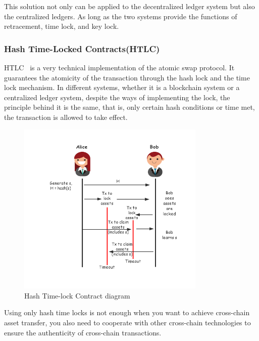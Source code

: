 \noindent This solution not only can be applied to the decentralized ledger system but also the centralized ledgers. As long as the two systems provide the functions of retracement, time lock, and key lock.

\subsubsection{Hash Time-Locked Contracts(HTLC)}
\noindent HTLC~\cite{russell2015lightning} is a very technical implementation of the atomic swap protocol. It guarantees the atomicity of the transaction through the hash lock and the time lock mechanism. In different systems, whether it is a blockchain system or a centralized ledger system, despite the ways of implementing the lock, the principle behind it is the same, that is, only certain hash conditions or time met, the transaction is allowed to take effect.

        \begin{figure}[H]
        \includegraphics[width=0.8\textwidth]{./figures/Hashlock.png}
        \centering
        \caption{Hash Time-lock Contract diagram}%
        \centering
        \label{fig:hash}
        \end{figure}
\noindent Using only hash time locks is not enough when you want to achieve cross-chain asset transfer, you also need to cooperate with other cross-chain technologies to ensure the authenticity of cross-chain transactions.


